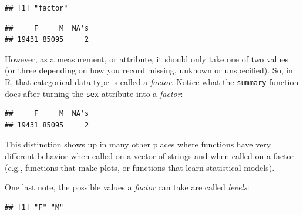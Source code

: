 \documentclass[12pt,]{book}
\newenvironment{Shaded}{\begin{snugshade}}{\end{snugshade}}
\newcommand{\KeywordTok}[1]{\textcolor[rgb]{0.13,0.29,0.53}{\textbf{#1}}}
\newcommand{\StringTok}[1]{\textcolor[rgb]{0.31,0.60,0.02}{#1}}
\newcommand{\OperatorTok}[1]{\textcolor[rgb]{0.81,0.36,0.00}{\textbf{#1}}}
\newcommand{\NormalTok}[1]{#1}
\theoremstyle{definition}
\theoremstyle{definition}
\theoremstyle{remark}
\begin{document}
\begin{verbatim}
## [1] "factor"
\end{verbatim}

\begin{Shaded}
\end{Shaded}

\begin{verbatim}
##     F     M  NA's 
## 19431 85095     2
\end{verbatim}

However, as a measurement, or attribute, it should only take one of two
values (or three depending on how you record missing, unknown or
unspecified). So, in R, that categorical data type is called a
\emph{factor}. Notice what the \texttt{summary} function does after
turning the \texttt{sex} attribute into a \emph{factor}:

\begin{Shaded}
\end{Shaded}

\begin{verbatim}
##     F     M  NA's 
## 19431 85095     2
\end{verbatim}

This distinction shows up in many other places where functions have very
different behavior when called on a vector of strings and when called on
a factor (e.g., functions that make plots, or functions that learn
statistical models).

One last note, the possible values a \emph{factor} can take are called
\emph{levels}:

\begin{Shaded}
\end{Shaded}

\begin{verbatim}
## [1] "F" "M"
\end{verbatim}
\end{document}
